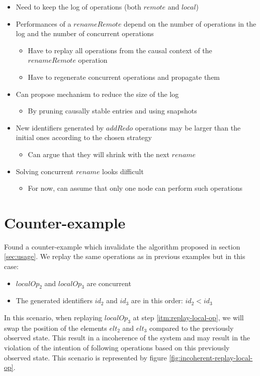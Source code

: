 \documentclass[a4paper]{article}
\begin{document}
\begin{itemize}
  \item Need to keep the log of operations (both $remote$ and $local$)
  \item Performances of a $renameRemote$ depend on the number of operations in the log and the number of concurrent operations
  \begin{itemize}
    \item Have to replay all operations from the causal context of the $renameRemote$ operation
    \item Have to regenerate concurrent operations and propagate them
  \end{itemize}
  \item Can propose mechanism to reduce the size of the log
  \begin{itemize}
    \item By pruning causally stable entries and using snapshots
  \end{itemize}
  \item New identifiers generated by $addRedo$ operations may be larger than the initial ones according to the chosen strategy
  \begin{itemize}
    \item Can argue that they will shrink with the next $rename$
  \end{itemize}
  \item Solving concurrent $rename$ looks difficult
  \begin{itemize}
    \item For now, can assume that only one node can perform such operations
  \end{itemize}
\end{itemize}

\section{Counter-example}

Found a counter-example which invalidate the algorithm proposed in section \ref{sec:usage}.
We replay the same operations as in previous examples but in this case:
\begin{itemize}
  \item $localOp_2$ and $localOp_3$ are concurrent
  \item The generated identifiers $id_2$ and $id_3$ are in this order: $id_2 < id_3$
\end{itemize}
In this scenario, when replaying $localOp_3$ at step \ref{itm:replay-local-op},
we will swap the position of the elements $elt_2$ and $elt_3$
compared to the previously observed state.
This result in a incoherence of the system and may result in the violation
of the intention of following operations based on this previously observed state.
This scenario is represented by figure \ref{fig:incoherent-replay-local-op}.
\end{document}
